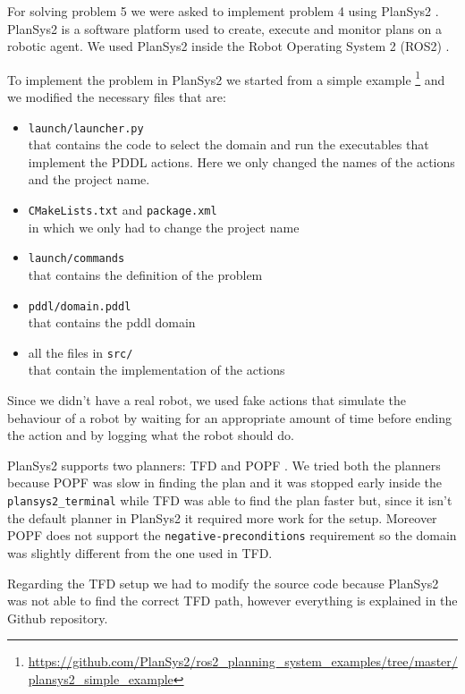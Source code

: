 For solving problem 5 we were asked to implement problem 4 using PlanSys2 \cite{plansys2}.
PlanSys2 is a software platform used to create, execute and monitor plans on a robotic agent. We used PlanSys2 inside the 
Robot Operating System 2 (ROS2) \cite{ros2}.

To implement the problem in PlanSys2 we started from a simple example \footnote{\url{https://github.com/PlanSys2/ros2_planning_system_examples/tree/master/plansys2_simple_example}} and we modified the necessary files that are:
\begin{itemize}
    \item \verb+launch/launcher.py+ \\ 
    that contains the code to select the domain and run the executables that implement the PDDL actions. Here we only changed the names of the actions and the project name.
    \item \verb+CMakeLists.txt+ and \verb+package.xml+ \\
    in which we only had to change the project name
    \item \verb+launch/commands+ \\
    that contains the definition of the problem
    \item \verb+pddl/domain.pddl+ \\
    that contains the pddl domain
    \item all the files in \verb+src/+ \\
    that contain the implementation of the actions
\end{itemize}

Since we didn't have a real robot, we used fake actions that simulate the 
behaviour of a robot by waiting for an appropriate amount of time before ending the action and by logging what the robot should do.

PlanSys2 supports two planners: TFD \cite{tfd} and POPF \cite{popf}.
We tried both the planners because POPF was slow in finding the plan and it 
was stopped early inside the \verb+plansys2_terminal+ while TFD was able to find the plan faster but, since it isn't the default planner in PlanSys2 it required more work for the setup. Moreover POPF does not support the \verb+negative-preconditions+ requirement so the domain was slightly different from the one used in TFD.

Regarding the TFD setup we had to modify the source code because PlanSys2 was not able to find the correct TFD path, however everything is explained in the Github repository.